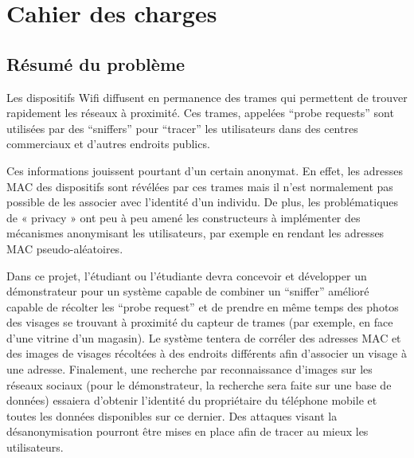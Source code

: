 \chapter{Cahier des charges}



\section*{Résumé du problème}
Les dispositifs Wifi diffusent en permanence des trames qui permettent de trouver rapidement les réseaux à
proximité. Ces trames, appelées “probe requests” sont utilisées par des “sniffers” pour “tracer” les utilisateurs dans
des centres commerciaux et d'autres endroits publics.

Ces informations jouissent pourtant d'un certain anonymat. En effet, les adresses MAC des dispositifs sont révélées
par ces trames mais il n'est normalement pas possible de les associer avec l'identité d'un individu. De plus, les
problématiques de « privacy » ont peu à peu amené les constructeurs à implémenter des mécanismes anonymisant
les utilisateurs, par exemple en rendant les adresses MAC pseudo-aléatoires.

Dans ce projet, l'étudiant ou l'étudiante devra concevoir et développer un démonstrateur pour un système capable
de combiner un “sniffer” amélioré capable de récolter les “probe request” et de prendre en même temps des
photos des visages se trouvant à proximité du capteur de trames (par exemple, en face d'une vitrine d'un magasin).
Le système tentera de corréler des adresses MAC et des images de visages récoltées à des endroits différents afin
d'associer un visage à une adresse. Finalement, une recherche par reconnaissance d'images sur les réseaux sociaux
(pour le démonstrateur, la recherche sera faite sur une base de données) essaiera d'obtenir l'identité du
propriétaire du téléphone mobile et toutes les données disponibles sur ce dernier. Des attaques visant la
désanonymisation pourront être mises en place afin de tracer au mieux les utilisateurs.

\clearpage
